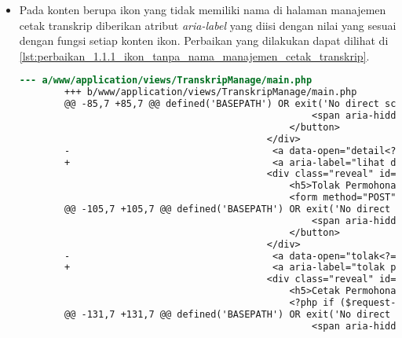 \begin{itemize}
    \item Pada konten berupa ikon yang tidak memiliki nama di halaman manajemen cetak transkrip diberikan atribut \textit{aria-label} yang diisi dengan nilai yang sesuai dengan fungsi setiap konten ikon. Perbaikan yang dilakukan dapat dilihat di \ref{lst:perbaikan_1.1.1_ikon_tanpa_nama_manajemen_cetak_transkrip}.
    \begin{lstlisting}[frame=single, label={lst:perbaikan_1.1.1_ikon_tanpa_nama_manajemen_cetak_transkrip}, language=diff, caption=Perbaikan Kriteria Sukses 1.1.1 - Ikon Tanpa Nama di Halaman Manajemen Cetak Transkrip]
        --- a/www/application/views/TranskripManage/main.php
        +++ b/www/application/views/TranskripManage/main.php
        @@ -85,7 +85,7 @@ defined('BASEPATH') OR exit('No direct script access allowed');
                                                    <span aria-hidden="true">&times;</span>
                                                </button>                                        
                                            </div>
        -                                    <a data-open="detail<?= $request->id ?>"><i class="fi-eye"></i></a>
        +                                    <a aria-label="lihat detail permohonan" data-open="detail<?= $request->id ?>"><i class="fi-eye"></i></a>
                                            <div class="reveal" id="tolak<?= $request->id ?>" data-reveal>
                                                <h5>Tolak Permohonan</h5>
                                                <form method="POST" action="/TranskripManage/answer">
        @@ -105,7 +105,7 @@ defined('BASEPATH') OR exit('No direct script access allowed');
                                                    <span aria-hidden="true">&times;</span>
                                                </button>
                                            </div>
        -                                    <a data-open="tolak<?= $request->id ?>"><i class="fi-dislike"></i></a>
        +                                    <a aria-label="tolak permohonan" data-open="tolak<?= $request->id ?>"><i class="fi-dislike"></i></a>
                                            <div class="reveal" id="cetak<?= $request->id ?>" data-reveal>
                                                <h5>Cetak Permohonan</h5>
                                                <?php if ($request->requestByNPM !== NULL): ?>
        @@ -131,7 +131,7 @@ defined('BASEPATH') OR exit('No direct script access allowed');
                                                    <span aria-hidden="true">&times;</span>

\end{lstlisting}
\end{itemize}

